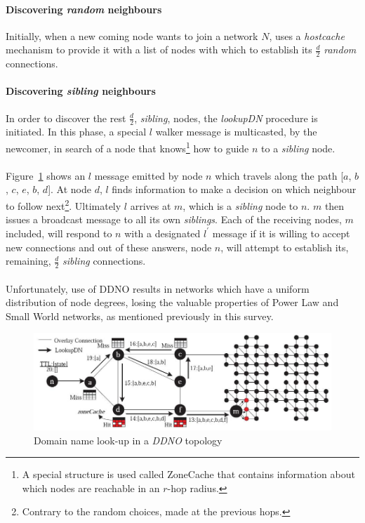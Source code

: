 \documentclass[a4paper,10pt]{article}
\begin{document}
\paragraph{Discovering \emph{random} neighbours}
Initially, when a new coming node wants to join a network $N$, uses a \emph{hostcache} mechanism to provide it with a list of nodes with which to establish its $\frac{d}{2}$ \emph{random} connections.

\paragraph{Discovering \emph{sibling} neighbours}
In order to discover the rest $\frac{d}{2}$, \emph{sibling}, nodes, the \emph{lookupDN} procedure is initiated. In this phase, a special $l$ walker message is multicasted, by the newcomer, in search of a node that knows\footnote{A special structure is used called ZoneCache that contains information about which nodes are reachable in an $r$-hop radius.} how to guide $n$ to a \emph{sibling} node.

\paragraph{}
Figure~\ref{figure:ddno_lookupdn} shows an $l$ message emitted by node $n$ which travels along the path [$a$, $b$, $c$, $e$, $b$, $d$]. At node $d$, $l$ finds information to make a decision on which neighbour to follow next\footnote{Contrary to the random choices, made at the previous hops.}. Ultimately $l$ arrives at $m$, which is a \emph{sibling} node to $n$. $m$ then issues a broadcast message to all its own \emph{siblings}. Each of the receiving nodes, $m$ included, will respond to $n$ with a designated $l^{'}$ message if it is willing to accept new connections and out of these answers, node $n$, will attempt to establish its, remaining, $\frac{d}{2}$ \emph{sibling} connections.

\paragraph{}
Unfortunately, use of DDNO results in networks which have a uniform distribution of node degrees, losing the valuable properties of Power Law and Small World networks, as mentioned previously in this survey.

\begin{figure}
\centering
  \includegraphics[scale=0.375]{img/ddno_lookupdn.jpeg}
\caption{Domain name look-up in a \emph{DDNO} topology}
\label{figure:ddno_lookupdn}
\end{figure}
\end{document}
